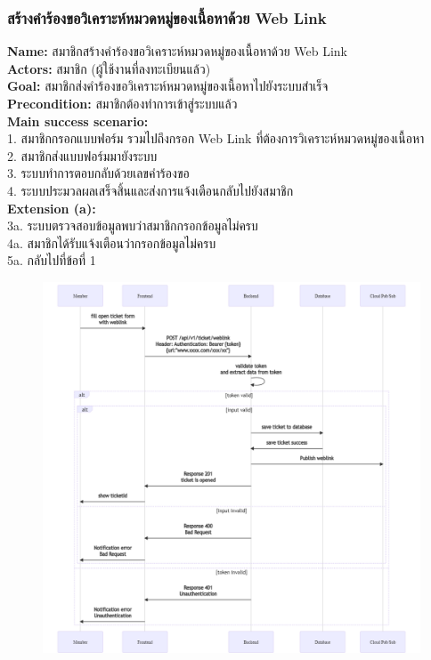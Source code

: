 \documentclass[12pt,oneside,openright,a4paper]{cpe-thai-project}
\begin{document}
\begin{itemize}
\subsubsection{สร้างคำร้องขอวิเคราะห์หมวดหมู่ของเนื้อหาด้วย Web Link}
\textbf{Name: }สมาชิกสร้างคำร้องขอวิเคราะห์หมวดหมู่ของเนื้อหาด้วย Web Link \\
\textbf{Actors: }สมาชิก (ผู้ใช้งานที่ลงทะเบียนแล้ว) \\
\textbf{Goal: }สมาชิกส่งคำร้องขอวิเคราะห์หมวดหมู่ของเนื้อหาไปยังระบบสำเร็จ \\
\textbf{Precondition: }สมาชิกต้องทำการเข้าสู่ระบบแล้ว \\
\textbf{Main success scenario: } \\
  \hspace*{0.5cm}1. สมาชิกกรอกแบบฟอร์ม รวมไปถึงกรอก Web Link ที่ต้องการวิเคราะห์หมวดหมู่ของเนื้อหา \\
  \hspace*{0.5cm}2. สมาชิกส่งแบบฟอร์มมายังระบบ \\
  \hspace*{0.5cm}3. ระบบทำการตอบกลับด้วยเลขคำร้องขอ \\
  \hspace*{0.5cm}4. ระบบประมวลผลเสร็จสิ้นและส่งการแจ้งเตือนกลับไปยังสมาชิก \\
\textbf{Extension (a): } \\
  \hspace*{0.5cm}3a. ระบบตรวจสอบข้อมูลพบว่าสมาชิกกรอกข้อมูลไม่ครบ \\
  \hspace*{0.5cm}4a. สมาชิกได้รับแจ้งเตือนว่ากรอกข้อมูลไม่ครบ \\
  \hspace*{0.5cm}5a. กลับไปที่ข้อที่ 1 \newpage
\begin{figure}[!ht]\centering
  \includegraphics[width=\textwidth]{./img/seq_weblink.png}

\end{figure}
\end{itemize}
\end{document}
